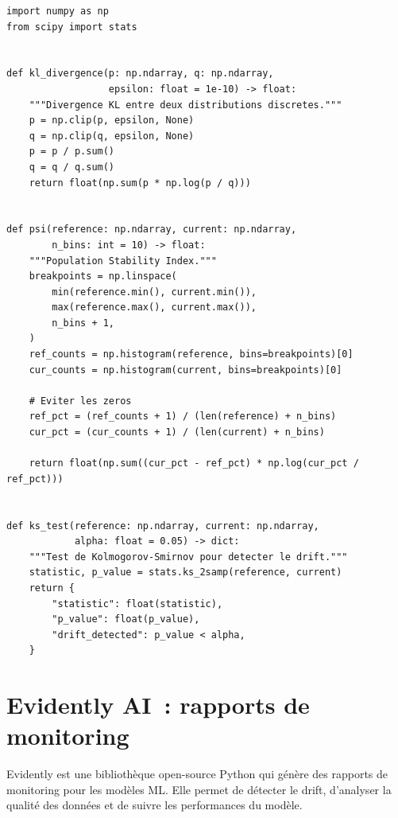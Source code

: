 \begin{codeblock}[title=\textbf{Impl\'ementation des m\'etriques de drift}]
\begin{verbatim}
import numpy as np
from scipy import stats


def kl_divergence(p: np.ndarray, q: np.ndarray,
                  epsilon: float = 1e-10) -> float:
    """Divergence KL entre deux distributions discretes."""
    p = np.clip(p, epsilon, None)
    q = np.clip(q, epsilon, None)
    p = p / p.sum()
    q = q / q.sum()
    return float(np.sum(p * np.log(p / q)))


def psi(reference: np.ndarray, current: np.ndarray,
        n_bins: int = 10) -> float:
    """Population Stability Index."""
    breakpoints = np.linspace(
        min(reference.min(), current.min()),
        max(reference.max(), current.max()),
        n_bins + 1,
    )
    ref_counts = np.histogram(reference, bins=breakpoints)[0]
    cur_counts = np.histogram(current, bins=breakpoints)[0]

    # Eviter les zeros
    ref_pct = (ref_counts + 1) / (len(reference) + n_bins)
    cur_pct = (cur_counts + 1) / (len(current) + n_bins)

    return float(np.sum((cur_pct - ref_pct) * np.log(cur_pct / ref_pct)))


def ks_test(reference: np.ndarray, current: np.ndarray,
            alpha: float = 0.05) -> dict:
    """Test de Kolmogorov-Smirnov pour detecter le drift."""
    statistic, p_value = stats.ks_2samp(reference, current)
    return {
        "statistic": float(statistic),
        "p_value": float(p_value),
        "drift_detected": p_value < alpha,
    }
\end{verbatim}
\end{codeblock}

\section{Evidently AI~: rapports de monitoring}
\label{sec:evidently}

Evidently est une biblioth\`eque open-source Python qui g\'en\`ere des rapports de monitoring pour les mod\`eles ML. Elle permet de d\'etecter le drift, d'analyser la qualit\'e des donn\'ees et de suivre les performances du mod\`ele.

